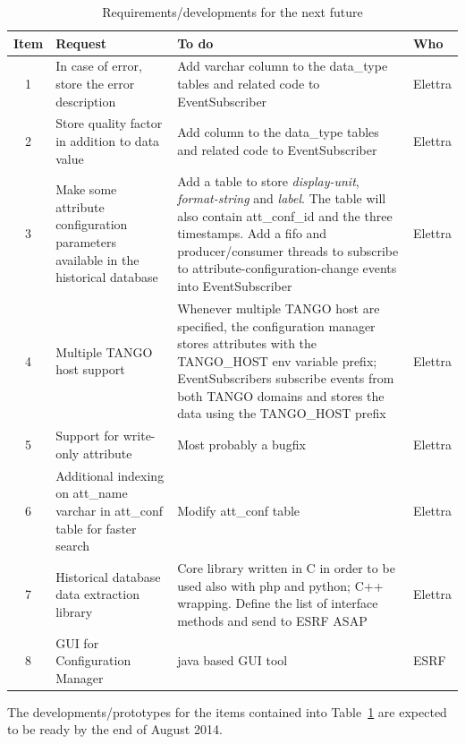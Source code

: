 \documentclass[11pt,a4paper]{article}
\begin{document}
\begin{table}[htb]
	\center
	\begin{tabular}{|c|p{6.1cm}|p{6.1cm}|p{1.1cm}|}
		\hline
		\bf{Item} & \bf{Request} & \bf{To do} & \bf{Who} \\
		\hline
		1 &
		In case of error, store the error description &
		Add varchar column to the data\_type tables and related code
		to EventSubscriber &
		Elettra\\
		\hline
		2 &
		Store quality factor in addition to data value &
		Add column to the data\_type tables and related code
		to EventSubscriber &
		Elettra \\
		\hline
		3 &
		Make some attribute configuration parameters available
		in the historical database &
		Add a table to store \emph{display-unit}, \emph{format-string}
		and \emph{label}. The table will also contain att\_conf\_id and
		the three timestamps.
		Add a fifo and producer/consumer threads to subscribe
		to attribute-configuration-change events into EventSubscriber &
		Elettra \\
		\hline
		4 &
		Multiple TANGO host support &
		Whenever multiple TANGO host are specified, the configuration
		manager stores attributes with the TANGO\_HOST env variable prefix;
		EventSubscribers subscribe events from both TANGO domains and
		stores the data using the TANGO\_HOST prefix &
		Elettra \\
		\hline
		5 &
		Support for write-only attribute &
		Most probably a bugfix &
		Elettra \\
		\hline
		6 &
		Additional indexing on att\_name varchar in att\_conf table
		for faster search &
		Modify att\_conf table &
		Elettra \\
		\hline
		7 &
		Historical database data extraction library &
		Core library written in C in order to be used also with
		php and python; C++ wrapping. Define the list of interface methods
		and send to ESRF ASAP &
		Elettra \\
		\hline
		8 &
		GUI for Configuration Manager &
		java based GUI tool &
		ESRF \\
		\hline
	\end{tabular}
	\caption{Requirements/developments for the next future}
	\label{tab:next-future}
\end{table}

The developments/prototypes for the items contained into
Table~\ref{tab:next-future} are expected to be ready by the
end of August 2014.

\newpage
\end{document}
